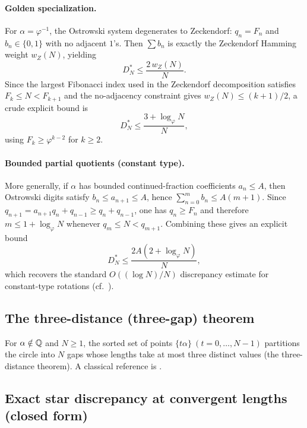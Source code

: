 \paragraph{Golden specialization.}
For $\alpha=\varphi^{-1}$, the Ostrowski system degenerates to Zeckendorf: $q_n=F_n$ and $b_n\in\{0,1\}$ with no adjacent $1$'s. Then $\sum b_n$ is exactly the Zeckendorf Hamming weight $w_Z(N)$, yielding
\begin{equation}
D_N^\ast\le \frac{2\,w_Z(N)}{N}.
\end{equation}
Since the largest Fibonacci index used in the Zeckendorf decomposition satisfies $F_k\le N< F_{k+1}$ and the no-adjacency constraint gives $w_Z(N)\le (k+1)/2$, a crude explicit bound is
\begin{equation}
D_N^\ast\le \frac{3+\log_\varphi N}{N},
\end{equation}
using $F_k\ge \varphi^{k-2}$ for $k\ge 2$.

\paragraph{Bounded partial quotients (constant type).}
More generally, if $\alpha$ has bounded continued-fraction coefficients $a_n\le A$, then Ostrowski digits satisfy $b_n\le a_{n+1}\le A$, hence $\sum_{n=0}^{m} b_n\le A(m+1)$. Since $q_{n+1}=a_{n+1}q_n+q_{n-1}\ge q_n+q_{n-1}$, one has $q_n\ge F_n$ and therefore $m\le 1+\log_\varphi N$ whenever $q_m\le N<q_{m+1}$. Combining these gives an explicit bound
\begin{equation}
D_N^\ast\le \frac{2A(2+\log_\varphi N)}{N},
\end{equation}
which recovers the standard $O((\log N)/N)$ discrepancy estimate for constant-type rotations (cf.\ \cite{KuipersNiederreiter1974}).

\subsection{The three-distance (three-gap) theorem}
\label{app:three_gap}

For $\alpha\notin\mathbb{Q}$ and $N\ge 1$, the sorted set of points $\{t\alpha\}\ (t=0,\ldots,N-1)$ partitions the circle into $N$ gaps whose lengths take at most three distinct values (the three-distance theorem). A classical reference is \cite{Slater1967}.

\subsection{Exact star discrepancy at convergent lengths (closed form)}
\label{app:convergent_star_discrepancy}

